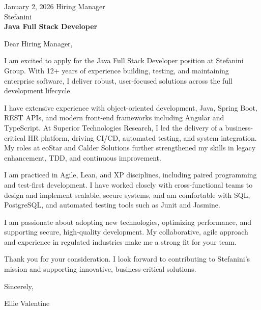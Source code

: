 \documentclass{../styles/coverletter}
\begin{document}
\populatedtitle





January 2, 2026\newline
Hiring Manager\\
Stefanini\\[4pt]
	\textbf{Java Full Stack Developer}\newline


Dear Hiring Manager,\newline


I am excited to apply for the Java Full Stack Developer position at Stefanini Group. With 12+ years of experience building, testing, and maintaining enterprise software, I deliver robust, user-focused solutions across the full development lifecycle.\newline

I have extensive experience with object-oriented development, Java, Spring Boot, REST APIs, and modern front-end frameworks including Angular and TypeScript. At Superior Technologies Research, I led the delivery of a business-critical HR platform, driving CI/CD, automated testing, and system integration. My roles at eoStar and Calder Solutions further strengthened my skills in legacy enhancement, TDD, and continuous improvement.\newline

I am practiced in Agile, Lean, and XP disciplines, including paired programming and test-first development. I have worked closely with cross-functional teams to design and implement scalable, secure systems, and am comfortable with SQL, PostgreSQL, and automated testing tools such as Junit and Jasmine.\newline

I am passionate about adopting new technologies, optimizing performance, and supporting secure, high-quality development. My collaborative, agile approach and experience in regulated industries make me a strong fit for your team.\newline

Thank you for your consideration. I look forward to contributing to Stefanini's mission and supporting innovative, business-critical solutions.\newline



Sincerely,\newline

Ellie Valentine
\end{document}

